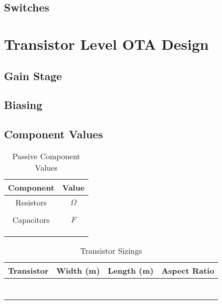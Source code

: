 \documentclass[journal]{IEEEtran}
\begin{document}
\subsection{Switches}

\section{Transistor Level OTA Design}
\subsection{Gain Stage}

\subsection{Biasing}

\subsection{Component Values}

\begin{table}
\centering
\caption{Passive Component Values}
\label{tab:passive_elements}
\begin{tabular}{|c|c|}
\hline Component & Value \\ 
\hline Resistors & $\Omega$ \\ 
\hline  &  \\ 
\hline Capacitors & $F$ \\ 
\hline  &  \\ 
\hline  &  \\ 
\hline  &  \\ 
\hline 
\end{tabular} 
\end{table}

\begin{table}
\centering
\caption{Transistor Sizings}
\label{tab:trans_sizes}
\begin{tabular}{|c|c|c|c|}
\hline Transistor & Width (m) & Length (m) & Aspect Ratio \\ 
\hline  &  &  &  \\ 
\hline  &  &  &  \\ 
\hline  &  &  &  \\ 
\hline  &  &  &  \\ 
\hline  &  &  &  \\ 
\hline  &  &  &  \\ 
\hline  &  &  &  \\ 
\hline 
\end{tabular} 
\end{table}
\end{document}

